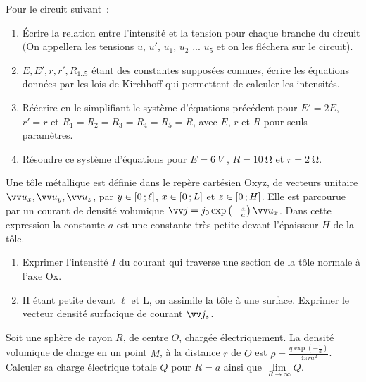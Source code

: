 \begin{exercice}
  Pour le circuit suivant~:
  \begin{enumerate}
  \item Écrire la relation entre l'intensité et la tension pour chaque branche du circuit (On appellera les tensions $u$, $u'$, $u_1$, $u_2$ ... $u_5$ et on les fléchera sur le circuit).
  \item $E, E', r, r', R_{1 .. 5}$ étant des constantes supposées connues, écrire les équations données par les lois de Kirchhoff qui permettent de calculer les intensités.
  \item Réécrire en le simplifiant le système d'équations précédent pour $E' = 2 E$, $r' = r$ et $R_1 = R_2 = R_3 = R_4 = R_5 = R$, avec $E$, $r$ et $R$ pour seuls paramètres.
  \item Résoudre ce système d'équations pour $E = \SI{6}{V}$ , $R = \SI{10}{\ohm}$ et $r = \SI{2}{\ohm}$.
  \end{enumerate}
\end{exercice}
\begin{exercice}
  Une tôle métallique est définie dans le repère cartésien Oxyz, de vecteurs unitaire $\ux, \uy, \uz$, par $y \in \left[ 0 \, ;  \ell \right]$, $x \in \left[ 0 \, ;  L \right]$ et $z \in \left[ 0 \, ;  H \right]$. Elle est parcourue par un courant de densité volumique $\vj = j_0 \exp\left(-\frac{z}{a}\right) \ux$. Dans cette expression la constante $a$ est une constante très petite devant l'épaisseur $H$ de la tôle.
  \begin{enumerate}
  \item Exprimer l'intensité $I$ du courant qui traverse une section de la tôle normale à l'axe Ox.
  \item H étant petite devant $\ell$ et L, on assimile la tôle à une surface. Exprimer le vecteur densité surfacique de courant $\vj_s$.
  \end{enumerate}
\end{exercice}
\begin{exercice}
  Soit une sphère de rayon $R$, de centre $O$, chargée électriquement. La densité volumique de charge en un point $M$, à la distance $r$ de $O$ est $\rho = \frac{q \exp\left(-\frac{r}{a}\right)}{4 \pi r a^2}$. Calculer sa charge électrique totale $Q$ pour $R = a$ ainsi que $\lim\limits_{R \to \infty} Q$.
\end{exercice}

